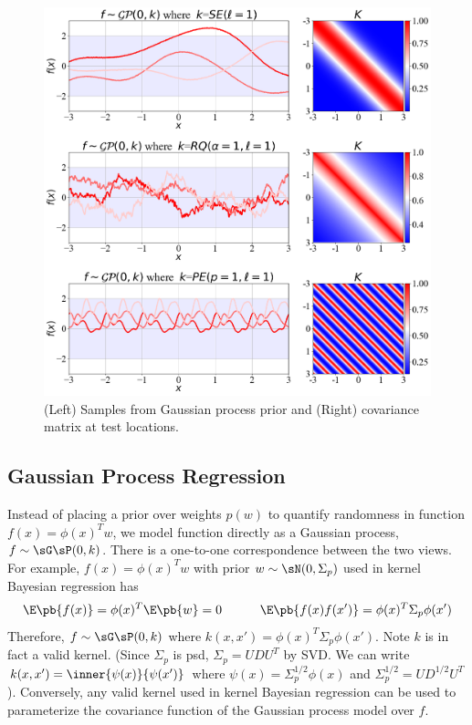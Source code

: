\documentclass[11pt]{article}
\begin{document}
\begin{center} 
\begin{figure}[h!]
    \includegraphics[width=\textwidth]{assets/plt_sample_from_gp.png} 
    \caption{(Left) Samples from Gaussian process prior and (Right) covariance matrix at test locations.}
    \label{fig:plt_sample_from_gp}
\end{figure}
\end{center} 
    

\subsection{Gaussian Process Regression}

Instead of placing a prior over weights $p(w)$ to quantify randomness in function $f(x)=\phi(x)^Tw$, we model function directly as a Gaussian process, $f\sim \sG\sP(0,k)$. There is a one-to-one correspondence between the two views. For example, $f(x)=\phi(x)^Tw$ with prior $w\sim \sN(0,\Sigma_p)$ used in kernel Bayesian regression has
\begin{align}
    \E\pb{f(x)}
        = \phi(x)^T \E\pb{w} = 0
    \quad\quad\quad
    \E\pb{ f(x)f(x') }
        = \phi(x)^T\Sigma_p \phi(x')
\end{align}
Therefore, $f\sim \sG\sP(0, k)$ where $k(x,x') = \phi(x)^T \Sigma_p \phi(x')$. Note $k$ is in fact a valid kernel. (Since $\Sigma_p$ is psd, $\Sigma_p = UDU^T$ by SVD. We can write $k(x,x') = \inner{\psi(x)}{\psi(x')}$ where $\psi(x) = \Sigma_p^{1/2} \phi(x)$ and $\Sigma_p^{1/2} = UD^{1/2}U^T$). Conversely, any valid kernel used in kernel Bayesian regression can be used to parameterize the covariance function of the Gaussian process model over $f$.
\end{document}
